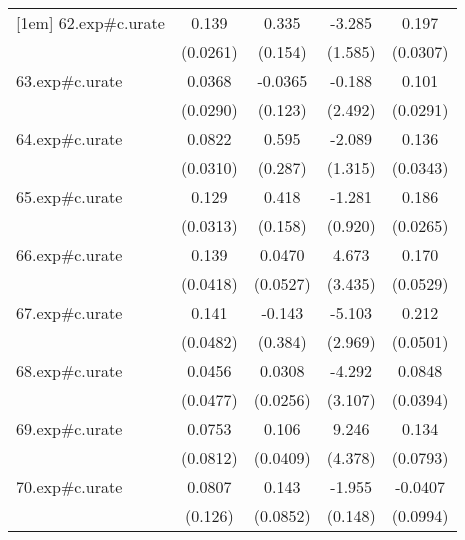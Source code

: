 {\begin{tabular}{l*{4}{c}}
[1em]
62.exp#c.urate&       0.139\sym{***}&       0.335\sym{*}  &      -3.285\sym{*}  &       0.197\sym{***}\\
            &    (0.0261)         &     (0.154)         &     (1.585)         &    (0.0307)         \\
[1em]
63.exp#c.urate&      0.0368         &     -0.0365         &      -0.188         &       0.101\sym{**} \\
            &    (0.0290)         &     (0.123)         &     (2.492)         &    (0.0291)         \\
[1em]
64.exp#c.urate&      0.0822\sym{*}  &       0.595\sym{*}  &      -2.089         &       0.136\sym{***}\\
            &    (0.0310)         &     (0.287)         &     (1.315)         &    (0.0343)         \\
[1em]
65.exp#c.urate&       0.129\sym{***}&       0.418\sym{*}  &      -1.281         &       0.186\sym{***}\\
            &    (0.0313)         &     (0.158)         &     (0.920)         &    (0.0265)         \\
[1em]
66.exp#c.urate&       0.139\sym{**} &      0.0470         &       4.673         &       0.170\sym{**} \\
            &    (0.0418)         &    (0.0527)         &     (3.435)         &    (0.0529)         \\
[1em]
67.exp#c.urate&       0.141\sym{**} &      -0.143         &      -5.103         &       0.212\sym{***}\\
            &    (0.0482)         &     (0.384)         &     (2.969)         &    (0.0501)         \\
[1em]
68.exp#c.urate&      0.0456         &      0.0308         &      -4.292         &      0.0848\sym{*}  \\
            &    (0.0477)         &    (0.0256)         &     (3.107)         &    (0.0394)         \\
[1em]
69.exp#c.urate&      0.0753         &       0.106\sym{*}  &       9.246\sym{*}  &       0.134         \\
            &    (0.0812)         &    (0.0409)         &     (4.378)         &    (0.0793)         \\
[1em]
70.exp#c.urate&      0.0807         &       0.143         &      -1.955\sym{***}&     -0.0407         \\
            &     (0.126)         &    (0.0852)         &     (0.148)         &    (0.0994)         \\

\end{tabular}}
